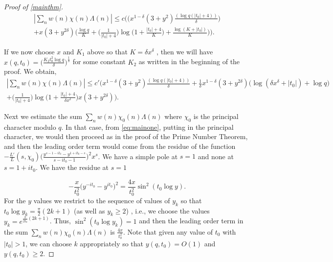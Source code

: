 \documentclass[letter,12pt]{article}
\theoremstyle{plain}
\theoremstyle{definition}
\theoremstyle{plain}
\begin{document}
\begin{proof}[Proof of \cref{mainthm}]

\begin{multline}
     |\sum_{n}w(n)\chi(n)\Lambda(n)|\leq c\Bigg(\Big(x^{1-\delta}(3+y^{2}) \frac{(\log q(|t_0|+4))}{\delta}\Big)\\ + x(3+ y^{2\delta})\Bigg(\frac{\log q}{K}+ \Big(\frac{1}{|t_0|+4}\Big)\log\Big(1+ \frac{|t_0|+4}{K}\Big)+\frac{\log(K+|t_0|)}{K} \Bigg)\Bigg).
\end{multline}

\noindent If we now choose $x$ and  $K_1$ above so that $K=\delta x^{\delta}$ , then we will have $x(q,t_0)=\Big(\frac{K_2 t_{0}^{2}\log q}{\delta}\Big)^{\frac{1}{\delta}}$ for some constant $K_2$ as written in the beginning of the proof. We obtain,
\begin{multline}\label{eq:oneimp}
     |\sum_{n}w(n)\chi(n)\Lambda(n)|\leq c'\Big(x^{1-\delta}(3+y^{2}) \frac{(\log q(|t_0|+4))}{\delta}+\frac{1}{\delta}x^{1-\delta}(3+y^{2\delta})\big(\log (\delta x^{\delta}+|t_0|)+\log q \big)\\ +\Big(\frac{1}{|t_0|+4}\Big)\log\Big(1+ \frac{|t_0|+4}{\delta x^{\delta}}\Big) x(3+y^{2\delta})\Big).
\end{multline}

Next we estimate the sum  $\sum\limits_{n}w(n)\chi_0(n)\Lambda(n)$ where $\chi_0$ is the principal character modulo $q$. In that case, from \cref{eq:mainone}, putting in the principal character, we would then proceed as in the proof of the Prime Number Theorem, and then the leading order term would come from the residue of the function $-\frac{L'}{L}(s,\chi_0) \Big(\frac{y^{s-1-it_0}-y^{1+it_0-s}}{s-it_0-1} \Big)^{2}x^{s}$. We have a simple pole at $s=1$ and none at $s=1+it_0$. We have the residue at $s=1$ 

\begin{equation}\label{eq:last}
    -\frac{x}{t_{0}^{2}}\big(y^{-it_0} -y^{it_0}\big)^{2}=\frac{4x}{t_{0}^{2}}\sin^{2}(t_0 \log y).
\end{equation}
For the $y$ values we restrict to the sequence of values of $y_k$ so that $t_0 \log y_k =\frac{\pi}{2}(2k+1)$ (as well as $y_k\geq 2$) , i.e., we choose the values $y_k=e^{\frac{\pi}{2t_0}(2k+1)}$. Thus, $\sin^{2}(t_0 \log y_k)=1$ and then the leading order term in the sum $\sum\limits_{n}w(n)\chi_0(n)\Lambda(n)$ is $\frac{4x}{t_{0}^{2}}$.  Note that given any value of $t_0$ with $|t_0|>1$, we can choose $k$ appropriately so that $y(q,t_0)=O(1)$ and $y(q,t_0)\geq 2$.


\end{proof}
\end{document}
